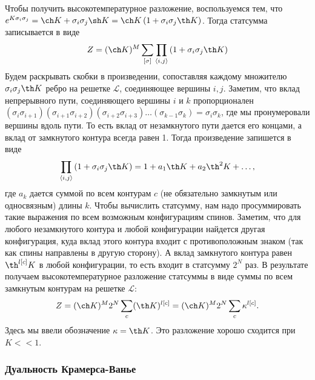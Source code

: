 \documentclass[a4paper,12pt]{article} \usepackage[utf8x]{inputenc} \usepackage[russian]{babel}
\theoremstyle{definition} \newtheorem{corollary}{Corollary}[theorem] \theoremstyle{definition}
\begin{document}
Чтобы получить высокотемпературное разложение, воспользуемся тем, что $e^{K\sigma_i\sigma_j}=\ch
K+\sigma_i\sigma_j\sh K=\ch K \left(1+\sigma_i\sigma_j \th K\right)$. Тогда статсумма записывается в
виде
\begin{equation}
  \label{eq:80} Z=(\ch K)^M\sum_{[\sigma]}\prod_{\left<i,j\right>}\left(1+\sigma_i \sigma_j \th
K\right)
\end{equation} Будем раскрывать скобки в произведении, сопоставляя каждому множителю
$\sigma_i\sigma_j \th K$ ребро на решетке $\mathcal{L}$, соединяющее вершины $i,j$. Заметим, что
вклад непрерывного пути, соединяющего вершины $i$ и $k$ пропорционален $(\sigma_i \sigma_{i+1})
(\sigma_{i+1}\sigma_{i+2}) (\sigma_{i+2}\sigma_{i+3})\dots
(\sigma_{k-1}\sigma_k)=\sigma_{i}\sigma_k$, где мы пронумеровали вершины вдоль пути. То есть вклад
от незамкнутого пути дается его концами, а вклад от замкнутого контура всегда равен 1. Тогда
произведение запишется в виде
\begin{equation}
  \label{eq:107} \prod_{\left<i,j\right>}\left(1+\sigma_i \sigma_j \th K\right)=1+a_1 \th K +a_2
\th^2 K+\dots,
\end{equation} где $a_k$ дается суммой по всем контурам $c$ (не обязательно замкнутым или
односвязным) длины $k$. Чтобы вычислить статсумму, нам надо просуммировать такие выражения по всем
возможным конфигурациям спинов. Заметим, что для любого незамкнутого контура и любой конфигурации
найдется другая конфигурация, куда вклад этого контура входит с противоположным знаком (так как
спины направлены в другую сторону). А вклад замкнутого контура равен $\th^{l[c]}K$ в любой
конфигурации, то есть входит в статсумму $2^N$ раз. В результате получаем высокотемпературное
разложение статсуммы в виде суммы по всем замкнутым контурам на решетке $\mathcal{L}$:
\begin{equation}
  \label{eq:108} Z=(\ch K)^M 2^N \sum_c (\th K)^{l[c]}=(\ch K)^M 2^N \sum_c \kappa^{l[c]}.
\end{equation} Здесь мы ввели обозначение $\kappa=\th K$. Это разложение хорошо сходится при $K<<1$.

\subsubsection{Дуальность Крамерса-Ванье}
\label{sec:duality}
\end{document}
